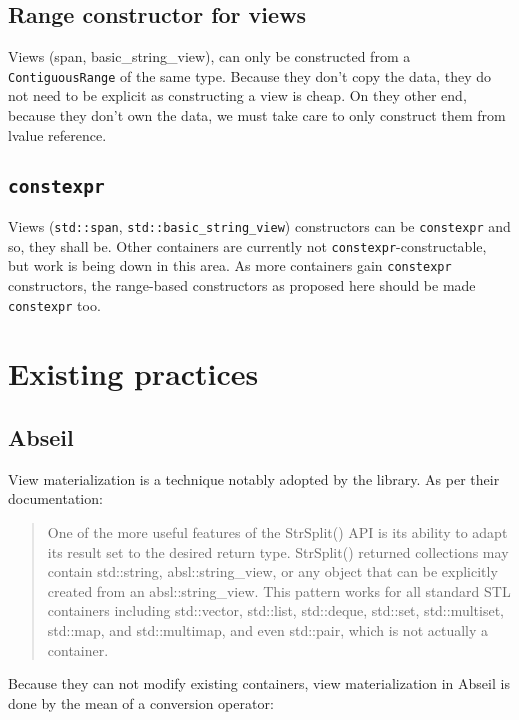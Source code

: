 \documentclass{wg21}
\newcommand{\cc}[1]{\texttt{#1}}
\begin{document}
\subsection{Range constructor for views}

Views (span, basic_string_view), can only be constructed from a \cc{ContiguousRange} of the same type.
Because they don't copy the data, they do not need to be explicit as constructing a view is cheap.
On they other end, because they don't own the data, we must take care to only construct them from lvalue reference.

\subsection{\cc{constexpr}}

Views (\cc{std::span}, \cc{std::basic_string_view}) constructors can be \cc{constexpr} and so, they shall be.
Other containers are currently not \cc{constexpr}-constructable, but work is being down in this area.
As more containers gain \cc{constexpr} constructors, the range-based constructors as proposed here should be made \cc{constexpr} too.

\section{Existing practices}

\subsection{Abseil}

View materialization is a technique notably adopted by the \cite{Abseil} library. As per their documentation:

\begin{quote}
	One of the more useful features of the StrSplit() API is its ability to adapt its result set to the desired return type. 
	StrSplit() returned collections may contain std::string, absl::string_view, or any object that can be explicitly created from an absl::string_view. 
	This pattern works for all standard STL containers including std::vector, 
	std::list, std::deque, std::set, std::multiset, std::map, and std::multimap, and even std::pair, which is not actually a container.
\end{quote}

Because they can not modify existing containers, view materialization in Abseil is done by the mean of a conversion operator:
\end{document}
